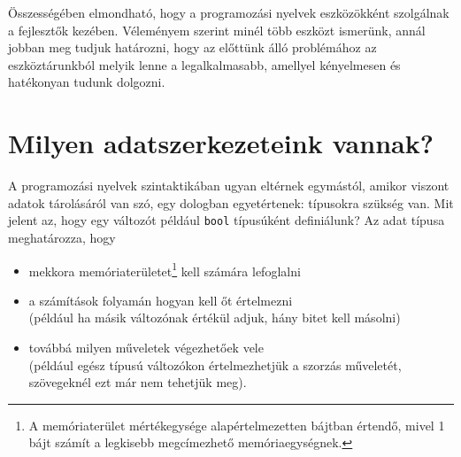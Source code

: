 \documentclass[tocnopagenum]{thesis-ekf}
\theoremstyle{definition}
\theoremstyle{remark}
\begin{document}
	Összességében elmondható, hogy a programozási nyelvek eszközökként szolgálnak a fejlesztők kezében. Véleményem szerint minél több eszközt ismerünk, annál jobban meg tudjuk határozni, hogy az előttünk álló problémához az eszköztárunkból melyik lenne a legalkalmasabb, amellyel kényelmesen és hatékonyan tudunk dolgozni.
	\section{Milyen adatszerkezeteink vannak?}
	A programozási nyelvek szintaktikában ugyan eltérnek egymástól, amikor viszont adatok tárolásáról van szó, egy dologban egyetértenek: típusokra szükség van. Mit jelent az, hogy egy változót például \verb*|bool| típusúként definiálunk? Az adat típusa meghatározza, hogy
	\begin{itemize}
		\item mekkora memóriaterületet\footnote{A memóriaterület mértékegysége alapértelmezetten bájtban értendő, mivel 1 bájt számít a legkisebb megcímezhető memóriaegységnek.} kell számára lefoglalni
		\item a számítások folyamán hogyan kell őt értelmezni\\(például ha másik változónak értékül adjuk, hány bitet kell másolni)
		\item továbbá milyen műveletek végezhetőek vele\\(például egész típusú változókon értelmezhetjük a szorzás műveletét, szövegeknél ezt már nem tehetjük meg).\cite{adatszerkezetek_88}
	\end{itemize}
\end{document}
